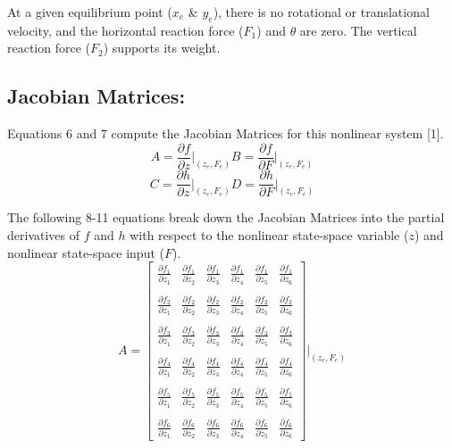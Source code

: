 \documentclass[conference]{IEEEtran}
\begin{document}
At a given equilibrium point ($x_e$ \& $y_e$), there is no rotational or translational velocity, and the horizontal reaction force ($F_1$) and $\theta$ are zero. The vertical reaction force ($F_2$) supports its weight. 

\subsection{Jacobian Matrices:}
Equations 6 and 7 compute the Jacobian Matrices for this nonlinear system [1].
\[ 
A = \frac{\partial f}{\partial z}\bigg|_{(z_e,F_e)}
B = \frac{\partial f}{\partial F}\bigg|_{(z_e,F_e)}
\tag{6}
\]
\[ 
C = \frac{\partial h}{\partial z}\bigg|_{(z_e,F_e)}
D = \frac{\partial h}{\partial F}\bigg|_{(z_e,F_e)}
\tag{7}
\]

The following 8-11 equations break down the Jacobian Matrices into the partial derivatives of $f$ and $h$ with respect to the nonlinear state-space variable ($z$) and nonlinear state-space input ($F$).
\vspace{-2mm}
\[
A = 
\begin{bmatrix}
\frac{\partial f_1}{\partial z_1}&\frac{\partial f_1}{\partial z_2}& \frac{\partial f_1}{\partial z_3}& \frac{\partial f_1}{\partial z_4}& \frac{\partial f_1}{\partial z_5} &\frac{\partial f_1}{\partial z_6}\\\\
\frac{\partial f_2}{\partial z_1}&\frac{\partial f_2}{\partial z_2}& \frac{\partial f_2}{\partial z_3}& \frac{\partial f_2}{\partial z_4}& \frac{\partial f_2}{\partial z_5} &\frac{\partial f_2}{\partial z_6}\\\\
\frac{\partial f_3}{\partial z_1}&\frac{\partial f_3}{\partial z_2}& \frac{\partial f_3}{\partial z_3}& \frac{\partial f_3}{\partial z_4}& \frac{\partial f_3}{\partial z_5} &\frac{\partial f_3}{\partial z_6}\\\\
\frac{\partial f_4}{\partial z_1}&\frac{\partial f_4}{\partial z_2}& \frac{\partial f_4}{\partial z_3}& \frac{\partial f_4}{\partial z_4}& \frac{\partial f_4}{\partial z_5} &\frac{\partial f_4}{\partial z_6}\\\\
\frac{\partial f_5}{\partial z_1}&\frac{\partial f_5}{\partial z_2}& \frac{\partial f_5}{\partial z_3}& \frac{\partial f_5}{\partial z_4}& \frac{\partial f_5}{\partial z_5} &\frac{\partial f_5}{\partial z_6}\\\\
\frac{\partial f_6}{\partial z_1}&\frac{\partial f_6}{\partial z_2}& \frac{\partial f_6}{\partial z_3}& \frac{\partial f_6}{\partial z_4}& \frac{\partial f_6}{\partial z_5} &\frac{\partial f_6}{\partial z_6}
\end{bmatrix}
\Bigg|_{(z_e,F_e)} 
\tag{8}
\] 
\end{document}

